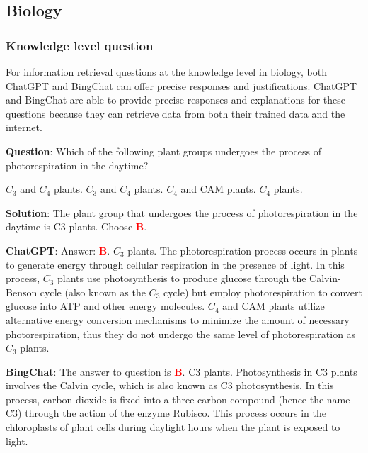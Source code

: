 \documentclass{article}
\begin{document}
{\begin{mdframed}[linewidth=1pt,linecolor=red]
		
		
	\end{mdframed}	
	
	\subsection{Biology}
	\label{VNHSGE_Bio}


	\subsubsection{Knowledge level question}
	\label{VNHSGE_Bio_K}
	
	For information retrieval questions at the knowledge level in biology, both ChatGPT and BingChat can offer precise responses and justifications. ChatGPT and BingChat are able to provide precise responses and explanations for these questions because they can retrieve data from both their trained data and the internet.
	
	
	\begin{mdframed}[linewidth=1pt,linecolor=red] \textbf{Question}: Which of the following plant groups undergoes the process of photorespiration in the daytime?
		
		\begin{oneparchoices}
			\choice $C_3$ and $C_4$ plants.
			\choice $C_3$ and $C_4$ plants.
			\choice $C_4$ and CAM plants.
			\choice $C_4$ plants.
		\end{oneparchoices}
		
		\textbf{Solution}: The plant group that undergoes the process of photorespiration in the daytime is C3 plants. Choose \textcolor{red}{\textbf{B}}. 
		
		\textbf{ChatGPT}: Answer: \textcolor{red}{\textbf{B}}. $C_3$ plants. The photorespiration process occurs in plants to generate energy through cellular respiration in the presence of light. In this process, $C_3$ plants use photosynthesis to produce glucose through the Calvin-Benson cycle (also known as the $C_3$ cycle) but employ photorespiration to convert glucose into ATP and other energy molecules. $C_4$ and CAM plants utilize alternative energy conversion mechanisms to minimize the amount of necessary photorespiration, thus they do not undergo the same level of photorespiration as $C_3$ plants.
		
		\textbf{BingChat}: The answer to question is \textcolor{red}{\textbf{B}}. C3 plants. Photosynthesis in C3 plants involves the Calvin cycle, which is also known as C3 photosynthesis. In this process, carbon dioxide is fixed into a three-carbon compound (hence the name C3) through the action of the enzyme Rubisco. This process occurs in the chloroplasts of plant cells during daylight hours when the plant is exposed to light.
		

\end{mdframed}}
\end{document}
